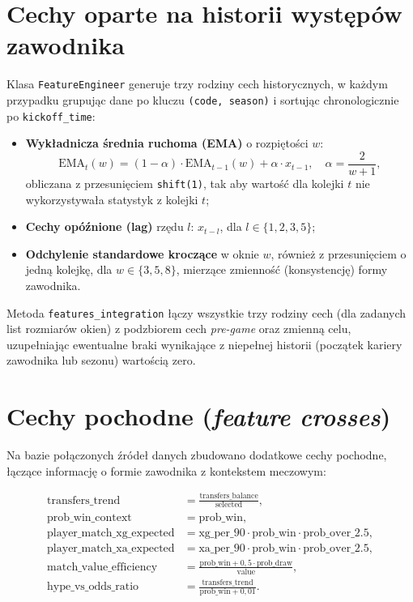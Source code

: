 \documentclass[a4paper,twoside,11pt]{mwrep}
\theoremstyle{plain} \newtheorem{thm}{Twierdzenie}
\theoremstyle{plain} \newtheorem{lem}{Lemat}
\theoremstyle{definition} \newtheorem{defn}{Definicja}
\theoremstyle{remark} \newtheorem*{rem}{Wniosek}
\begin{document}
\section{Cechy oparte na historii występów zawodnika}

Klasa \texttt{FeatureEngineer} generuje trzy rodziny cech historycznych, w
każdym przypadku grupując dane po kluczu \texttt{(code, season)} i
sortując chronologicznie po \texttt{kickoff\_time}:

\begin{itemize}
    \item \textbf{Wykładnicza średnia ruchoma (EMA)} o rozpiętości $w$:
    \begin{equation}
        \text{EMA}_t(w) = \left(1-\alpha\right)\cdot \text{EMA}_{t-1}(w) + \alpha \cdot x_{t-1}, \quad \alpha = \frac{2}{w+1},
    \end{equation}
    obliczana z przesunięciem \texttt{shift(1)}, tak aby wartość dla
    kolejki $t$ nie wykorzystywała statystyk z kolejki $t$;
    \item \textbf{Cechy opóźnione (lag)} rzędu $l$: $x_{t-l}$, dla
    $l \in \{1,2,3,5\}$;
    \item \textbf{Odchylenie standardowe kroczące} w oknie $w$, również z
    przesunięciem o jedną kolejkę, dla $w \in \{3,5,8\}$, mierzące
    zmienność (konsystencję) formy zawodnika.
\end{itemize}

Metoda \texttt{features\_integration} łączy wszystkie trzy rodziny cech
(dla zadanych list rozmiarów okien) z podzbiorem cech \emph{pre-game} oraz
zmienną celu, uzupełniając ewentualne braki wynikające z niepełnej historii
(początek kariery zawodnika lub sezonu) wartością zero.

\section{Cechy pochodne (\emph{feature crosses})}

Na bazie połączonych źródeł danych zbudowano dodatkowe cechy pochodne,
łączące informację o formie zawodnika z kontekstem meczowym:

\begin{align}
    \text{transfers\_trend} &= \frac{\text{transfers\_balance}}{\text{selected}}, \\[4pt]
    \text{prob\_win\_context} &= \text{prob\_win}, \\[4pt]
    \text{player\_match\_xg\_expected} &= \text{xg\_per\_90} \cdot \text{prob\_win} \cdot \text{prob\_over\_2.5}, \\[4pt]
    \text{player\_match\_xa\_expected} &= \text{xa\_per\_90} \cdot \text{prob\_win} \cdot \text{prob\_over\_2.5}, \\[4pt]
    \text{match\_value\_efficiency} &= \frac{\text{prob\_win} + 0{,}5 \cdot \text{prob\_draw}}{\text{value}}, \\[4pt]
    \text{hype\_vs\_odds\_ratio} &= \frac{\text{transfers\_trend}}{\text{prob\_win} + 0{,}01}.
\end{align}
\end{document}
